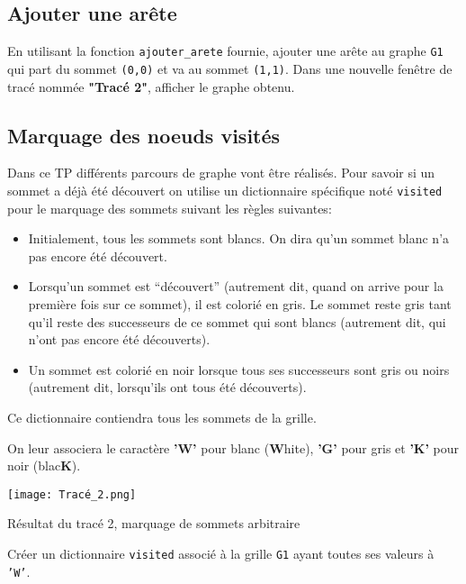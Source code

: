 \subsection*{Ajouter une arête}

\begin{question}
En utilisant la fonction \texttt{ajouter\_arete} fournie, ajouter une arête au graphe \texttt{G1} qui part du sommet \texttt{(0,0)} et va au sommet \texttt{(1,1)}. Dans une nouvelle fenêtre de tracé nommée \textbf{"Tracé 2"}, afficher le graphe obtenu.


\end{question}


\subsection*{Marquage des noeuds visités}
Dans ce TP différents parcours de graphe vont être réalisés. Pour savoir si un sommet a déjà été découvert on utilise un dictionnaire spécifique  noté \texttt{visited} pour le marquage des sommets suivant les règles suivantes:  

\begin{itemize}
\item
 Initialement, tous les sommets sont blancs. On dira qu’un sommet blanc n’a pas encore été
découvert.
\item Lorsqu’un sommet est “découvert” (autrement dit, quand on arrive pour la première fois sur
ce sommet), il est colorié en gris. Le sommet reste gris tant qu’il reste des successeurs de ce
sommet qui sont blancs (autrement dit, qui n’ont pas encore été découverts).
\item Un sommet est colorié en noir lorsque tous ses successeurs sont gris ou noirs (autrement dit,
lorsqu’ils ont tous été découverts).

\end{itemize}


Ce dictionnaire contiendra tous les sommets de la grille.

On leur associera le caractère \textbf{'W'} pour blanc (\textbf{W}hite), \textbf{'G'} pour gris et \textbf{'K'} pour noir (blac\textbf{K}).


\begin{marginfigure}
\texttt{[image: Tracé\_2.png]}
\caption{Résultat du tracé 2, marquage de sommets arbitraire}
\end{marginfigure}

\begin{question}
Créer un dictionnaire \texttt{visited} associé à la grille  \texttt{G1} ayant toutes ses valeurs à \texttt{'W'}.
\end{question}


